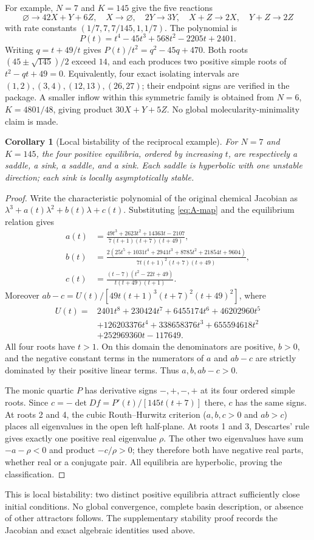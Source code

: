 \documentclass[11pt]{article}
\newtheorem{corollary}{Corollary}
\newcommand{\zero}{\varnothing}
\begin{document}
For example, $N=7$ and $K=145$ give the five reactions
\[
\zero\to42X+Y+6Z,\quad X\to\zero,\quad2Y\to3Y,\quad
X+Z\to2X,\quad Y+Z\to2Z
\]
with rate constants $(1/7,7,7/145,1,1/7)$. The polynomial is
\[
P(t)=t^4-45t^3+568t^2-2205t+2401.
\]
Writing $q=t+49/t$ gives $P(t)/t^2=q^2-45q+470$. Both roots $(45\pm\sqrt{145})/2$ exceed $14$, and each produces two positive simple roots of $t^2-qt+49=0$. Equivalently, four exact isolating intervals are $(1,2),(3,4),(12,13),(26,27)$; their endpoint signs are verified in the package. A smaller inflow within this symmetric family is obtained from $N=6$, $K=4801/48$, giving product $30X+Y+5Z$. No global molecularity-minimality claim is made.

\begin{corollary}[Local bistability of the reciprocal example]\label{cor:stability}
For $N=7$ and $K=145$, the four positive equilibria, ordered by increasing $t$, are respectively a saddle, a sink, a saddle, and a sink. Each saddle is hyperbolic with one unstable direction; each sink is locally asymptotically stable.
\end{corollary}
\begin{proof}
Write the characteristic polynomial of the original chemical Jacobian as
$\lambda^3+a(t)\lambda^2+b(t)\lambda+c(t)$. Substituting \eqref{eq:A-map} and the equilibrium relation gives
\begin{align*}
a(t)&=\frac{49t^3+2623t^2+14363t-2107}{7(t+1)(t+7)(t+49)},\\
b(t)&=\frac{2(25t^5+1031t^4+2941t^3+8785t^2+21854t+9604)}
{7t(t+1)^2(t+7)(t+49)},\\
c(t)&=\frac{(t-7)(t^2-22t+49)}{t(t+49)(t+1)}.
\end{align*}
Moreover $ab-c=U(t)/[49t(t+1)^3(t+7)^2(t+49)^2]$, where
\begin{align*}
U(t)={}&2401t^8+230424t^7+6455174t^6+46202960t^5\\
&+126203376t^4+338658376t^3+655594618t^2\\
&+252969360t-117649.
\end{align*}
All four roots have $t>1$. On this domain the denominators are positive, $b>0$, and the negative constant terms in the numerators of $a$ and $ab-c$ are strictly dominated by their positive linear terms. Thus $a,b,ab-c>0$.

The monic quartic $P$ has derivative signs $-,+,-,+$ at its four ordered simple roots. Since $c=-\det Df=P'(t)/[145t(t+7)]$ there, $c$ has the same signs. At roots 2 and 4, the cubic Routh--Hurwitz criterion ($a,b,c>0$ and $ab>c$) places all eigenvalues in the open left half-plane. At roots 1 and 3, Descartes' rule gives exactly one positive real eigenvalue $\rho$. The other two eigenvalues have sum $-a-\rho<0$ and product $-c/\rho>0$; they therefore both have negative real parts, whether real or a conjugate pair. All equilibria are hyperbolic, proving the classification.
\end{proof}
This is local bistability: two distinct positive equilibria attract sufficiently close initial conditions. No global convergence, complete basin description, or absence of other attractors follows. The supplementary stability proof records the Jacobian and exact algebraic identities used above.
\end{document}
